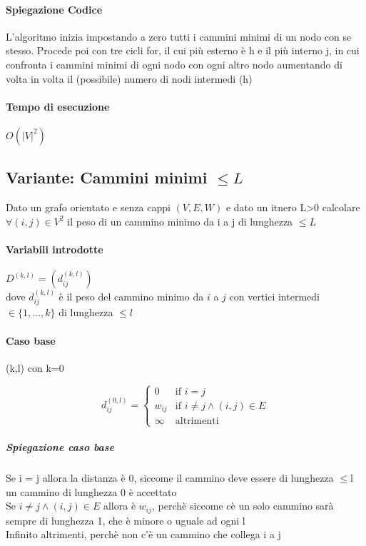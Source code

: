 \documentclass[12pt, a4paper, openany]{book}
\begin{document}
\paragraph{Spiegazione Codice}
L'algoritmo inizia impostando a zero tutti i cammini minimi di un nodo con se stesso.
Procede poi con tre cicli for, il cui più esterno è h e il più interno j, in cui confronta i cammini minimi
di ogni nodo con ogni altro nodo aumentando di volta in volta il (possibile) numero di nodi intermedi (h)

\paragraph{Tempo di esecuzione}
\begin{center}
	$O(|V|^2)$
\end{center}

\subsection{Variante: Cammini minimi $\leq L$}

Dato un grafo orientato e senza cappi $(V,E,W)$ e dato un itnero L\textgreater0 calcolare
$\forall (i,j) \in V^2$ il peso di un cammino minimo da i a j di lunghezza $\leq L$

\paragraph{Variabili introdotte} $D^{(k,l)}= (d^{(k,l)}_{ij})$ \\
dove $d^{(k,l)}_{ij}$ è il peso del cammino minimo da $i$ a $j$
con vertici intermedi $\in \{1,...,k\}$ di lunghezza $\leq l$

\paragraph{Caso base} (k,l) con k=0

\begin{equation*}
	d^{(0,l)}_{ij}= \begin{cases}
		0      & \text{if $i = j$}                      \\
		w_{ij} & \text{if $i \neq j \land (i,j) \in E$} \\
		\infty & \text{altrimenti}
	\end{cases}
\end{equation*}

\subparagraph{Spiegazione caso base}
Se i = j allora la distanza è 0, siccome il cammino deve essere di lunghezza $\leq$l un cammino di lunghezza 0 è accettato
\\Se $i \neq j \land (i,j) \in E$ allora è $w_{ij}$, perchè siccome cè un solo cammino sarà sempre di lunghezza 1, che è minore o uguale ad ogni l
\\Infinito altrimenti, perchè non c'è un cammino che collega i a j
\end{document}
